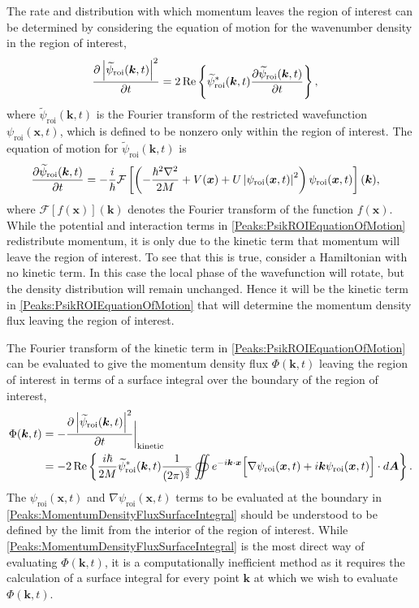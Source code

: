 The rate and distribution with which momentum leaves the region of interest can be determined by considering the equation of motion for the wavenumber density in the region of interest,
\begin{align}
    \frac{\partial \left|\widetilde{\psi}_\text{roi}(\bm{k}, t)\right|^2}{\partial t} &= 2 \operatorname{Re} \left\{ \widetilde{\psi}_\text{roi}^*(\bm{k}, t) \frac{\partial \widetilde{\psi}_\text{roi}(\bm{k}, t)}{\partial t} \right \},
\end{align}
where $\widetilde{\psi}_\text{roi}(\bm{k}, t)$ is the Fourier transform of the restricted wavefunction $\psi_\text{roi}(\bm{x}, t)$, which is defined to be nonzero only within the region of interest. The equation of motion for $\widetilde{\psi}_\text{roi}(\bm{k}, t)$ is
\begin{align}
    \label{Peaks:PsikROIEquationOfMotion}
    \frac{\partial \widetilde{\psi}_\text{roi}(\bm{k}, t)}{\partial t} &= -\frac{i}{\hbar} \mathcal{F}\left[\left(-\frac{\hbar^2 \nabla^2}{2M} + V(\bm{x}) + U \abs{\psi_\text{roi}(\bm{x}, t)}^2\right) \psi_\text{roi}(\bm{x}, t)\right](\bm{k}),
\end{align}
where $\mathcal{F}[f(\bm{x})](\bm{k})$ denotes the Fourier transform of the function $f(\bm{x})$. While the potential and interaction terms in \eqref{Peaks:PsikROIEquationOfMotion} redistribute momentum, it is only due to the kinetic term that momentum will leave the region of interest. To see that this is true, consider a Hamiltonian with no kinetic term. In this case the local phase of the wavefunction will rotate, but the density distribution will remain unchanged. Hence it will be the kinetic term in \eqref{Peaks:PsikROIEquationOfMotion} that will determine the momentum density flux leaving the region of interest.

The Fourier transform of the kinetic term in \eqref{Peaks:PsikROIEquationOfMotion} can be evaluated to give the momentum density flux $\Phi(\bm{k}, t)$ leaving the region of interest in terms of a surface integral over the boundary of the region of interest,
\begin{align}
    \Phi(\bm{k}, t) & = -\frac{\partial \abs{\widetilde{\psi}_\text{roi}(\bm{k}, t)}^2}{\partial t}\bigg|_\text{kinetic}\\
    & = -2 \Re \left\{ \frac{i \hbar}{2 M} \widetilde{\psi}_\text{roi}^*(\bm{k}, t) \frac{1}{(2 \pi)^{\frac{3}{2}}}\oiint e^{-i \bm{k}\cdot \bm{x}} \Big[ \nabla \psi_\text{roi}(\bm{x}, t) + i \bm{k} \psi_\text{roi}(\bm{x}, t)\Big] \cdot d \bm{A} \right\}.
    \label{Peaks:MomentumDensityFluxSurfaceIntegral}
\end{align}
The $\psi_\text{roi}(\bm{x}, t)$ and $\nabla\psi_\text{roi}(\bm{x}, t)$ terms to be evaluated at the boundary in \eqref{Peaks:MomentumDensityFluxSurfaceIntegral} should be understood to be defined by the limit from the interior of the region of interest. While \eqref{Peaks:MomentumDensityFluxSurfaceIntegral} is the most direct way of evaluating $\Phi(\bm{k}, t)$, it is a computationally inefficient method as it requires the calculation of a surface integral for every point $\bm{k}$ at which we wish to evaluate $\Phi(\bm{k}, t)$. 

